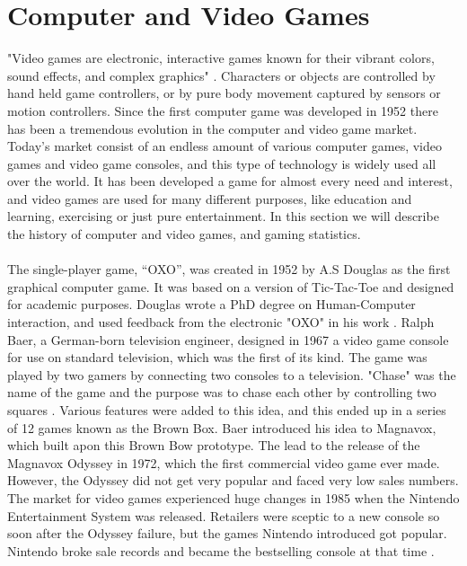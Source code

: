 \section{Computer and Video Games}
"Video games are electronic, interactive games known for their vibrant colors, sound effects, and complex graphics" \cite{videogamedef}. Characters or objects are controlled by hand held game controllers, or by pure body movement captured by sensors or motion controllers. Since the first computer game was developed in 1952 there has been a tremendous evolution in the computer and video game market. Today's market consist of an endless amount of various computer games, video games and video game consoles, and this type of technology is widely used all over the world. It has been developed a game for almost every need and interest, and video games are used for many different purposes, like education and learning, exercising or just pure entertainment. In this section we will describe the history of computer and video games, and gaming statistics. \\ \\
The single-player game, “OXO”, was created in 1952 by A.S Douglas as the first graphical computer game. It was based on a version of Tic-Tac-Toe and designed for academic purposes.  Douglas wrote a PhD degree on Human-Computer interaction, and used feedback from the electronic "OXO" in his work \cite{abouthiginbotham}. Ralph Baer, a German-born television engineer, designed in 1967 a video game console for use on standard television, which was the first of its kind. The game was played by two gamers by connecting two consoles to a television. "Chase" was the name of the game and the purpose was to chase each other by controlling two squares \cite{videogameHistory}. Various features were added to this idea, and this ended up in a series of 12 games known as the Brown Box. Baer introduced his idea to Magnavox, which built apon this Brown Bow prototype. The lead to the release of the Magnavox Odyssey in 1972, which the first commercial video game ever made. However, the Odyssey did not get very popular and faced very low sales numbers. The market for video games experienced huge changes in 1985 when the Nintendo Entertainment System was released. Retailers were sceptic to a new console so soon after the Odyssey failure, but the games Nintendo introduced got popular. Nintendo broke sale records and became the bestselling console at that time \cite{consoleHistory}. \\ \\
